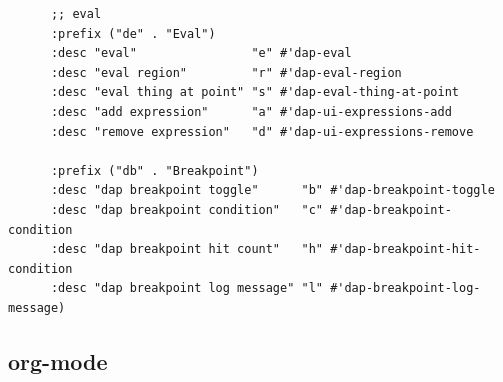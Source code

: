 \documentclass[11pt]{article}
\begin{document}
\begin{verbatim}
      ;; eval
      :prefix ("de" . "Eval")
      :desc "eval"                "e" #'dap-eval
      :desc "eval region"         "r" #'dap-eval-region
      :desc "eval thing at point" "s" #'dap-eval-thing-at-point
      :desc "add expression"      "a" #'dap-ui-expressions-add
      :desc "remove expression"   "d" #'dap-ui-expressions-remove

      :prefix ("db" . "Breakpoint")
      :desc "dap breakpoint toggle"      "b" #'dap-breakpoint-toggle
      :desc "dap breakpoint condition"   "c" #'dap-breakpoint-condition
      :desc "dap breakpoint hit count"   "h" #'dap-breakpoint-hit-condition
      :desc "dap breakpoint log message" "l" #'dap-breakpoint-log-message)
\end{verbatim}

\subsection{org-mode}
\label{sec:orgd8c1a1c}
\end{document}
